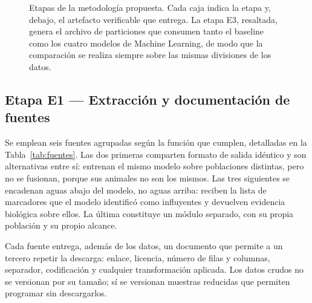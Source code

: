 \documentclass[conference]{IEEEtran}
\begin{document}
\begin{figure}[!t]
{%
}
\caption{Etapas de la metodología propuesta. Cada caja indica la etapa y,
debajo, el artefacto verificable que entrega. La etapa E3, resaltada,
genera el archivo de particiones que consumen tanto el baseline como los
cuatro modelos de Machine Learning, de modo que la comparación se realiza
siempre sobre las mismas divisiones de los datos.}
\label{fig:etapas}
\end{figure}

\subsection{Etapa E1 — Extracción y documentación de fuentes}

Se emplean seis fuentes agrupadas según la función que cumplen, detalladas
en la Tabla~\ref{tab:fuentes}. Las dos primeras comparten formato de
salida idéntico y son alternativas entre sí: entrenan el mismo modelo
sobre poblaciones distintas, pero no se fusionan, porque sus animales no
son los mismos. Las tres siguientes se encadenan aguas abajo del modelo,
no aguas arriba: reciben la lista de marcadores que el modelo identificó
como influyentes y devuelven evidencia biológica sobre ellos. La última
constituye un módulo separado, con su propia población y su propio
alcance.

Cada fuente entrega, además de los datos, un documento que permite a un
tercero repetir la descarga: enlace, licencia, número de filas y columnas,
separador, codificación y cualquier transformación aplicada. Los datos
crudos no se versionan por su tamaño; sí se versionan muestras reducidas
que permiten programar sin descargarlos.
\end{document}

